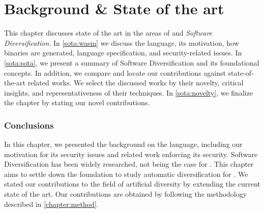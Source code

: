 \chapter{Background \& State of the art}

This chapter discusses state of the art in the areas of \emph{\wasm} and \emph{Software Diversification}. In \autoref{sota:wasm} we discuss the \wasm language, its motivation, how \wasm binaries are generated, language specification, and security-related issues. In \autoref{sota:sota}, we present a summary of Software Diversification and its foundational concepts. In addition, we compare and locate our contributions against state-of-the-art related works.  
We select the discussed works by their novelty, critical insights, and representativeness of their techniques. 
In \autoref{sota:novelty}, we finalize the chapter by stating our novel contributions. 







\subsection*{Conclusions}
In this chapter, we presented the background on the \wasm language, including our motivation for its security issues and related work enforcing its security.
Software Diversification has been widely researched, not being the case for \wasm. This chapter aims to settle down the foundation to study automatic diversification for \wasm. We stated our contributions to the field of artificial diversity by extending the current state of the art. 
Our contributions are obtained by following the methodology described in \autoref{chapter:method}.
